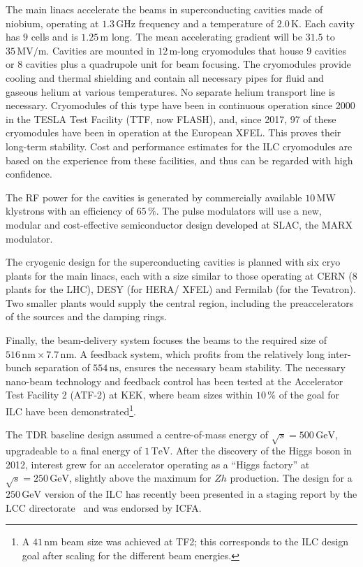 \documentclass[%
 reprint,
 amsmath,amssymb,
 aps,
]{revtex4-1}
\newcommand{\jim}[1]{\textcolor{black}{#1}}
\begin{document}
The main linacs accelerate the beams in superconducting cavities made of niobium, operating at $1.3\,{\mathrm{GHz}}$ frequency and a temperature of $2.0\,{\mathrm{K}}$. 
Each cavity has $9$ cells and is $1.25\,{\mathrm{m}}$ long. 
The mean accelerating gradient will be $31.5$ to $35\,{\mathrm{MV/m}}$.
Cavities are mounted in $12\,{\mathrm{m}}$-long cryomodules that house $9$ cavities or $8$ cavities plus a quadrupole unit for beam focusing. 
The cryomodules provide cooling and thermal shielding and contain all
necessary pipes for fluid and gaseous helium at various temperatures. 
No separate helium transport line is necessary.
Cryomodules of this type have been in continuous 
operation since 2000 in the TESLA Test Facility (TTF, now FLASH), and, 
since 2017, 97 of these cryomodules have been in operation at the
European XFEL.   This proves their 
long-term stability. 
Cost and performance estimates for the ILC cryomodules are based on
the 
experience from these facilities, and thus can be regarded with high confidence. 

The RF power for the cavities is generated by commercially available $10\,{\mathrm{MW}}$ klystrons with an efficiency of $65\,\%$. 
The pulse modulators will use a new, modular and cost-effective semiconductor design \jim{developed} at SLAC, the MARX modulator.

The cryogenic design for the superconducting cavities is planned with six cryo plants for the
main linacs, each with a size similar to those operating at CERN (8
plants for the LHC), 
DESY (for HERA/ XFEL) and Fermilab (for the Tevatron).
Two smaller plants would supply the central region, including the preaccelerators of the sources and the damping rings. 

Finally, the beam-delivery system focuses the beams 
to the required size of $516\,{\mathrm{nm}} \times 7.7\,{\mathrm{nm}} $. 
A feedback system, which profits from the relatively long
 inter-bunch separation of $554\,{\mathrm{ns}}$, ensures the necessary beam stability. 
The necessary nano-beam technology and feedback control 
has been tested at the Accelerator
Test Facility 2 (ATF-2) at KEK, where beam sizes within $10\,\%$ of
the goal for ILC have 
been demonstrated\footnote{A $41\,{\mathrm{nm}}$ beam size was
  achieved at TF2; this corresponds to the ILC design goal after
  scaling for the different beam energies.}.
 

The TDR baseline design assumed
 a centre-of-mass energy of $\sqrt{s}=500\,{\mathrm{GeV}}$, upgradeable to a final energy of $1\,{\mathrm{TeV}}$.
After the discovery of the Higgs boson in 2012, interest 
grew for an accelerator operating as a ``Higgs factory'' at
 $\sqrt{s}=250\,{\mathrm{GeV}}$, slightly above the maximum for $Zh$ production. 
The design for a $250\,{\mathrm{GeV}}$ version of the 
ILC has recently been presented in a  staging
 report by the LCC directorate~\cite{Evans:2017rvt} and was endorsed by ICFA.
\end{document}
